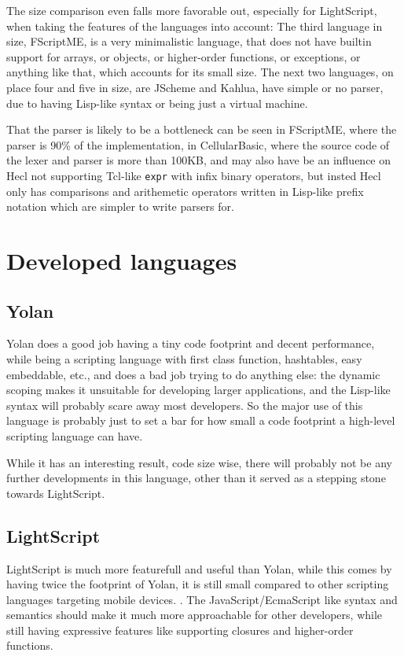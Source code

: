 \documentclass[11pt]{report}
\begin{document}
The size comparison even falls more favorable out, especially for LightScript, when taking the features of the languages into account:
The third language in size, FScriptME, is a very minimalistic language, that does not have builtin support for arrays, or objects, or higher-order functions, or exceptions, or anything like that, which accounts for its small size.
The next two languages, on place four and five in size, are JScheme and Kahlua,
have simple or no parser, due to having Lisp-like syntax or being just a virtual machine.

That the parser is likely to be a bottleneck can be seen in FScriptME, where the parser is 90\% of the implementation, in CellularBasic, where the source code of the lexer and parser is more than 100KB, and may also have be an influence on Hecl not supporting Tcl-like \verb|expr| with infix binary operators, but insted Hecl only has comparisons and arithemetic operators written in Lisp-like prefix notation which are simpler to write parsers for.

\section{Developed languages}
\subsection{Yolan}
Yolan does a good job having a tiny code footprint and decent performance, while being a scripting language with first class function, hashtables, easy embeddable, etc., and does a bad job trying to do anything else:
the dynamic scoping makes it unsuitable for developing larger applications, and the Lisp-like syntax will probably scare away most developers.
So the major use of this language is probably just to set a bar for how small a code footprint a high-level scripting language can have.

While it has an interesting result, code size wise, there will probably not be any further developments in this language, other than it served as a stepping stone towards LightScript.

\subsection{LightScript}
LightScript is much more featurefull and useful than Yolan, while this comes by having twice the footprint of Yolan, it is still small compared to other scripting languages targeting mobile devices. .
The JavaScript/EcmaScript like syntax and semantics should make it much more approachable for other developers, while still having expressive features like supporting closures and higher-order functions.
\end{document}
